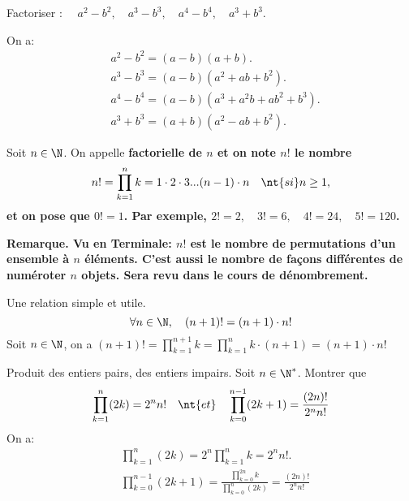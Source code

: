 \documentclass[11pt]{article}
\begin{document}
\begin{ex}{}{}
    \begin{center}
        Factoriser : $\quad a^2-b^2,\quad a^3-b^3,\quad a^4-b^4,\quad a^3+b^3$.
    \end{center}
    \tcblower
    On a:
    \begin{align*}
        &a^2-b^2=(a-b)(a+b).\\
        &a^3-b^3=(a-b)(a^2+ab+b^2).\\
        &a^4-b^4=(a-b)(a^3+a^2b+ab^2+b^3).\\
        &a^3+b^3=(a+b)(a^2-ab+b^2).
    \end{align*}
\end{ex}

\begin{defi}{}{}
    Soit $n\in\N$. On appelle \bf{factorielle} de $n$ et on note $n!$ le nombre
    \begin{equation*}
        n!=\prod_{k=1}^nk=1\cdot2\cdot3...(n-1)\cdot n \quad\nt{si }n\geq1,
    \end{equation*}
    et on pose que $0!=1$. Par exemple, $2!=2,\quad3!=6,\quad4!=24,\quad5!=120$.
\end{defi}

\bf{Remarque.} Vu en Terminale: $n!$ est le nombre de permutations d'un ensemble à $n$ éléments. C'est aussi le nombre de façons différentes de numéroter $n$ objets. Sera revu dans le cours de dénombrement.

\begin{prop}{Une relation simple et utile.}{}
    \begin{equation*}
        \forall n \in \N, \quad (n+1)! = (n+1)\cdot n!
    \end{equation*}
    \tcblower
    Soit $n\in\N$, on a $(n+1)!=\prod_{k=1}^{n+1}k=\prod_{k=1}^nk\cdot(n+1)=(n+1)\cdot n!$
\end{prop}

\begin{ex}{Produit des entiers pairs, des entiers impairs.}{}
    Soit $n\in\N^*$. Montrer que
    \begin{equation*}
        \prod_{k=1}^n(2k)=2^nn!\quad\nt{et}\quad\prod_{k=0}^{n-1}(2k+1)=\frac{(2n)!}{2^nn!}
    \end{equation*}
    \tcblower
    On a:
    \begin{align*}
        &\prod_{k=1}^n(2k)=2^n\prod_{k=1}^nk=2^nn!.\\
        &\prod_{k=0}^{n-1}(2k+1)=\frac{\prod_{k=0}^{2n}k}{\prod_{k=0}^n(2k)}=\frac{(2n)!}{2^nn!}
    \end{align*}
\end{ex}
\end{document}
